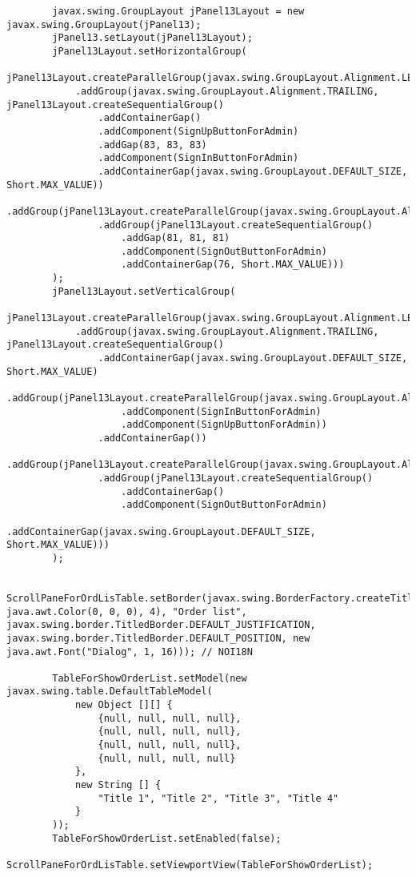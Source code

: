 \documentclass[12pt,a4paper]{article}
\begin{document}
\begin{lstlisting}
        javax.swing.GroupLayout jPanel13Layout = new javax.swing.GroupLayout(jPanel13);
        jPanel13.setLayout(jPanel13Layout);
        jPanel13Layout.setHorizontalGroup(
            jPanel13Layout.createParallelGroup(javax.swing.GroupLayout.Alignment.LEADING)
            .addGroup(javax.swing.GroupLayout.Alignment.TRAILING, jPanel13Layout.createSequentialGroup()
                .addContainerGap()
                .addComponent(SignUpButtonForAdmin)
                .addGap(83, 83, 83)
                .addComponent(SignInButtonForAdmin)
                .addContainerGap(javax.swing.GroupLayout.DEFAULT_SIZE, Short.MAX_VALUE))
            .addGroup(jPanel13Layout.createParallelGroup(javax.swing.GroupLayout.Alignment.LEADING)
                .addGroup(jPanel13Layout.createSequentialGroup()
                    .addGap(81, 81, 81)
                    .addComponent(SignOutButtonForAdmin)
                    .addContainerGap(76, Short.MAX_VALUE)))
        );
        jPanel13Layout.setVerticalGroup(
            jPanel13Layout.createParallelGroup(javax.swing.GroupLayout.Alignment.LEADING)
            .addGroup(javax.swing.GroupLayout.Alignment.TRAILING, jPanel13Layout.createSequentialGroup()
                .addContainerGap(javax.swing.GroupLayout.DEFAULT_SIZE, Short.MAX_VALUE)
                .addGroup(jPanel13Layout.createParallelGroup(javax.swing.GroupLayout.Alignment.BASELINE)
                    .addComponent(SignInButtonForAdmin)
                    .addComponent(SignUpButtonForAdmin))
                .addContainerGap())
            .addGroup(jPanel13Layout.createParallelGroup(javax.swing.GroupLayout.Alignment.LEADING)
                .addGroup(jPanel13Layout.createSequentialGroup()
                    .addContainerGap()
                    .addComponent(SignOutButtonForAdmin)
                    .addContainerGap(javax.swing.GroupLayout.DEFAULT_SIZE, Short.MAX_VALUE)))
        );

        ScrollPaneForOrdLisTable.setBorder(javax.swing.BorderFactory.createTitledBorder(javax.swing.BorderFactory.createLineBorder(new java.awt.Color(0, 0, 0), 4), "Order list", javax.swing.border.TitledBorder.DEFAULT_JUSTIFICATION, javax.swing.border.TitledBorder.DEFAULT_POSITION, new java.awt.Font("Dialog", 1, 16))); // NOI18N

        TableForShowOrderList.setModel(new javax.swing.table.DefaultTableModel(
            new Object [][] {
                {null, null, null, null},
                {null, null, null, null},
                {null, null, null, null},
                {null, null, null, null}
            },
            new String [] {
                "Title 1", "Title 2", "Title 3", "Title 4"
            }
        ));
        TableForShowOrderList.setEnabled(false);
        ScrollPaneForOrdLisTable.setViewportView(TableForShowOrderList);


\end{lstlisting}
\end{document}
